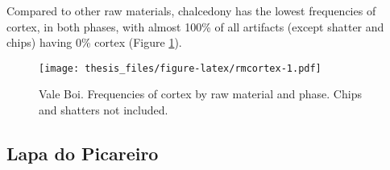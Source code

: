 \documentclass[12pt,twoside]{reedthesis}
\begin{document}
Compared to other raw materials, chalcedony has the lowest frequencies of cortex, in both phases, with almost 100\% of all artifacts (except shatter and chips) having 0\% cortex (Figure \ref{fig:rmcortex}).
\begin{figure}
\centering
\texttt{[image: thesis\_files/figure-latex/rmcortex-1.pdf]}
\caption{\label{fig:rmcortex}Vale Boi. Frequencies of cortex by raw material and phase. Chips and shatters not included.}
\end{figure}
\begin{table}

\caption{\label{tab:cortextab1}Vale Boi - Lower 5. Frequencies of cortex type by raw material.}
\centering
{}
\end{table}
\begin{table}

\caption{\label{tab:cortextab2}Vale Boi - Upper 5/4E. Frequencies of cortex typeby raw material.}
\centering
{}
\end{table}
\hypertarget{lapa-do-picareiro-3}{%
\subsection{Lapa do Picareiro}\label{lapa-do-picareiro-3}}
\end{document}
